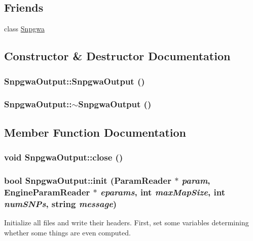 \subsection*{Friends}
\begin{DoxyCompactItemize}
\item 
class \hyperlink{classSnpgwaOutput_aa527c01a3a830865c14e42f7d302622d}{Snpgwa}
\end{DoxyCompactItemize}


\subsection{Constructor \& Destructor Documentation}
\hypertarget{classSnpgwaOutput_a422139dc18d6a32d36312e35a40a9a1c}{
\subsubsection[{SnpgwaOutput}]{\setlength{\rightskip}{0pt plus 5cm}SnpgwaOutput::SnpgwaOutput ()}}
\label{classSnpgwaOutput_a422139dc18d6a32d36312e35a40a9a1c}
\hypertarget{classSnpgwaOutput_af599a28d1b3e2e0b08152c4da3fe5474}{
\subsubsection[{$\sim$SnpgwaOutput}]{\setlength{\rightskip}{0pt plus 5cm}SnpgwaOutput::$\sim$SnpgwaOutput ()}}
\label{classSnpgwaOutput_af599a28d1b3e2e0b08152c4da3fe5474}


\subsection{Member Function Documentation}
\hypertarget{classSnpgwaOutput_a7994a4d439344d2f2839686eba5b0251}{
\subsubsection[{close}]{\setlength{\rightskip}{0pt plus 5cm}void SnpgwaOutput::close ()}}
\label{classSnpgwaOutput_a7994a4d439344d2f2839686eba5b0251}
\hypertarget{classSnpgwaOutput_a52e7ec60c5feb78958b62702c5b82918}{
\subsubsection[{init}]{\setlength{\rightskip}{0pt plus 5cm}bool SnpgwaOutput::init ({\bf ParamReader} $\ast$ {\em param}, \/  {\bf EngineParamReader} $\ast$ {\em eparams}, \/  int {\em maxMapSize}, \/  int {\em numSNPs}, \/  string {\em message})}}
\label{classSnpgwaOutput_a52e7ec60c5feb78958b62702c5b82918}
Initialize all files and write their headers. First, set some variables determining whether some things are even computed.

